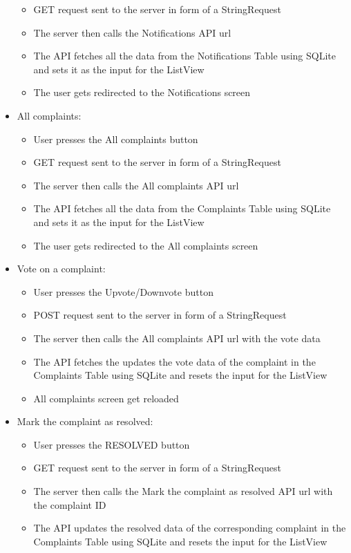 \documentclass[12pt]{article}
\begin{document}
\begin{itemize}
\begin{itemize}
	\item GET request sent to the server in form of a StringRequest
	\item The server then calls the Notifications API url
	\item The API fetches all the data from the Notifications Table using SQLite and sets it as the input for the ListView
	\item The user gets redirected to the Notifications screen
\end{itemize}
\item All complaints:
\begin{itemize}
	\color {blue}
	\item User presses the All complaints button
	\item GET request sent to the server in form of a StringRequest
	\item The server then calls the All complaints API url
	\item The API fetches all the data from the Complaints Table using SQLite and sets it as the input for the ListView
	\item The user gets redirected to the All complaints screen
\end{itemize}
\item Vote on a complaint:
\begin{itemize}
	\color {blue}
	\item User presses the Upvote/Downvote button
	\item POST request sent to the server in form of a StringRequest
	\item The server then calls the All complaints API url with the vote data
	\item The API fetches the updates the vote data of the complaint in the Complaints Table using SQLite and resets the input for the ListView
	\item All complaints screen get reloaded
\end{itemize}
\item Mark the complaint as resolved:
\begin{itemize}
	\color {blue}
	\item User presses the RESOLVED button
	\item GET request sent to the server in form of a StringRequest
	\item The server then calls the Mark the complaint as resolved API url with the complaint ID
	\item The API updates the resolved data of the corresponding complaint in the Complaints Table using SQLite and resets the input for the ListView

\end{itemize}
\end{itemize}
\end{document}

